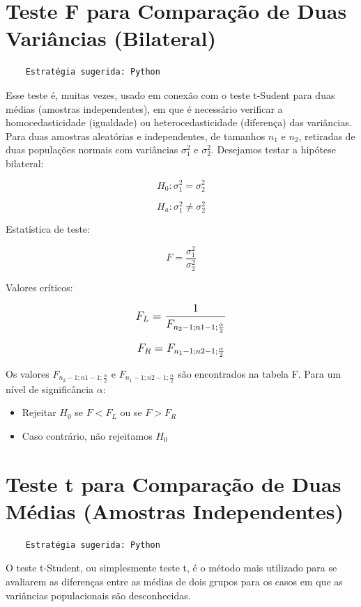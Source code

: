 \section{Teste F para Comparação de Duas Variâncias (Bilateral)}

\begin{verbatim}
	Estratégia sugerida: Python 
\end{verbatim}

Esse teste é, muitas vezes, usado em conexão com o teste t-Sudent para duas médias (amostras
independentes), em que é necessário verificar a homocedasticidade (igualdade) ou
heterocedasticidade (diferença) das variâncias. Para duas amostras aleatórias e independentes, de tamanhos \(n_1\) e \(n_2\), retiradas de duas populações normais com variâncias \(\sigma_1^2\) e
\(\sigma_2^2\). Desejamos testar a hipótese bilateral: 

\[H_0: \sigma_1^2 = \sigma_2^2\]

\[H_a: \sigma_1^2 \neq \sigma_2^2\]

Estatística de teste:

\[ F = \frac{\sigma_1^2}{\sigma_2^2} \]

Valores críticos:

\[\beq{ F_L = \frac{1}{F_{n_2-1;n1-1;\frac{\alpha}{2}}} }\]

\[\beq{ F_R = F_{n_1-1;n2-1;\frac{\alpha}{2}} }\]

Os valores \( F_{n_2-1;n1-1;\frac{\alpha}{2}} \) e \(F_{n_1-1;n2-1;\frac{\alpha}{2}}\) são encontrados na  tabela F. Para um nível de significância \(\alpha\):
\begin{itemize}
	\item Rejeitar \(H_0\) se \(F < F_L\) ou se \(F>F_R\)
	\item Caso contrário, não rejeitamos \(H_0\)
\end{itemize}

\section{Teste t para Comparação de Duas Médias (Amostras Independentes)}

\begin{verbatim}
	Estratégia sugerida: Python
\end{verbatim}

O teste t-Student, ou simplesmente teste t, é o método mais utilizado para se avaliarem as diferenças entre as médias de dois grupos para os casos em que as variâncias populacionais são desconhecidas.


